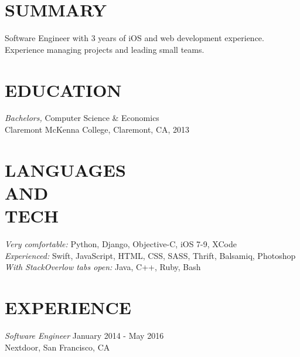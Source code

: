 \documentclass[margin, 10pt]{res} %
\begin{document}
\begin{resume}
 
\section{SUMMARY}  

Software Engineer with 3 years of iOS and web development experience. Experience managing projects and leading small teams.


\section{EDUCATION}

{\sl Bachelors,} Computer Science \& Economics \\
Claremont McKenna College, Claremont, CA, 2013 \\


\section{LANGUAGES \\ AND \\ TECH} 

{\sl Very comfortable:} Python, Django, Objective-C, iOS 7-9, XCode \\
{\sl Experienced:} Swift, JavaScript, HTML, CSS, SASS, Thrift, Balsamiq, Photoshop \\
{\sl With StackOverlow tabs open:} Java, C++, Ruby, Bash \\

 
\section{EXPERIENCE}

{\sl Software Engineer} \hfill January 2014 - May 2016 \\
Nextdoor, San Francisco, CA 


\end{resume}
\end{document}
